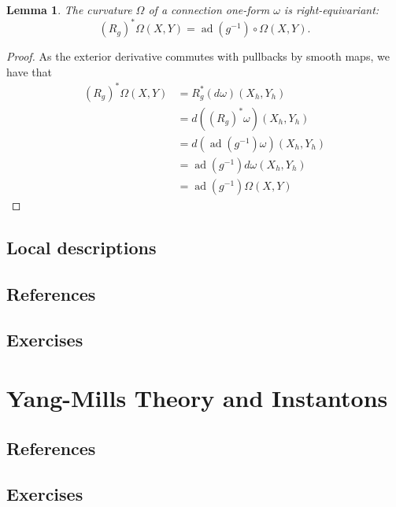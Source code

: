 \documentclass{book}
\DeclareMathOperator{\ad}{ad}
\theoremstyle{plain}
\newtheorem{lem}[thm]{Lemma}
\theoremstyle{definition}
\theoremstyle{remark}
\begin{document}
\begin{lem}
The curvature $\Omega$ of a connection one-form $\omega$ is right-equivariant:
\[(R_g)^*\Omega(X,Y)=\ad(g^{-1})\circ \Omega(X,Y).\]
\end{lem}
\begin{proof}
As the exterior derivative commutes with pullbacks by smooth maps, we have that
\begin{align*}
(R_g)^*\Omega(X,Y)&=R_g^*(d\omega)(X_h,Y_h)\\
&=d((R_g)^*\omega)(X_h,Y_h)\\
&=d(\ad(g^{-1})\omega)(X_h,Y_h)\\
&=\ad(g^{-1})d\omega(X_h,Y_h)\\
&=\ad(g^{-1})\Omega(X,Y)
\end{align*}
\end{proof}


\section{Local descriptions}
\section{References}
\section{Exercises}













\chapter{Yang-Mills Theory and Instantons}
\section{References}
\section{Exercises}
\end{document}
